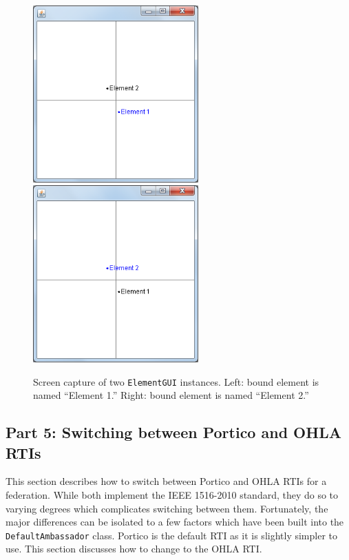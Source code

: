 \documentclass[]{article}
\begin{document}
\begin{figure}
\centering
\includegraphics[width=2.5in]{element1ScreenCapture} \hspace{.125in}
\includegraphics[width=2.5in]{element2ScreenCapture}
\caption{Screen capture of two \texttt{ElementGUI} instances. Left: bound element is named ``Element 1.'' Right: bound element is named ``Element 2.''}
\label{fig:elementScreenCapture}
\end{figure}

\subsection{Part 5: Switching between Portico and OHLA RTIs}

This section describes how to switch between Portico and OHLA RTIs for a federation. While both implement the IEEE 1516-2010 standard, they do so to varying degrees which complicates switching between them. Fortunately, the major differences can be isolated to a few factors which have been built into the \texttt{DefaultAmbassador} class. Portico is the default RTI as it is slightly simpler to use. This section discusses how to change to the OHLA RTI.
\end{document}
